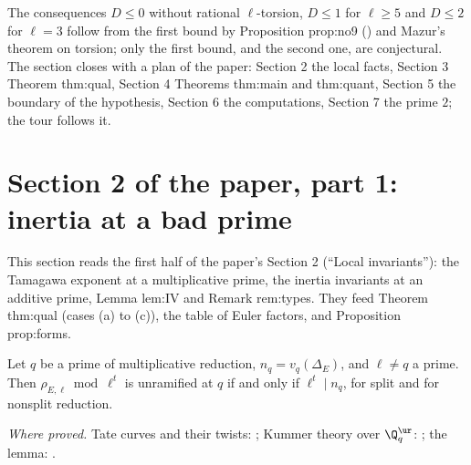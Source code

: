 \begin{sloppypar}
\noindent The consequences $D\le0$ without rational $\ell$-torsion, $D\le1$ for $\ell\ge5$ and $D\le2$ for $\ell=3$ follow from the first bound by Proposition prop:no9
() and Mazur's theorem on torsion; only the first bound, and the second one, are conjectural. The section closes with a plan of the paper:
Section 2 the local facts, Section 3 Theorem thm:qual, Section 4 Theorems thm:main and thm:quant, Section 5 the boundary of the hypothesis, Section 6 the
computations, Section 7 the prime $2$; the tour follows it.

\section[Paper 2: inertia]{Section 2 of the paper, part 1: inertia at a bad prime}\label{sec:paper:inertia}

This section reads the first half of the paper's Section 2 (``Local invariants''): the Tamagawa exponent at a multiplicative prime, the inertia
invariants at an additive prime, Lemma lem:IV and Remark rem:types. They feed Theorem thm:qual (cases (a) to (c)), the table of Euler factors, and
Proposition prop:forms.

\begin{lemma}\label{lem:paper:tamagawa-exp}
Let $q$ be a prime of multiplicative reduction, $n_q=v_q(\Delta_E)$, and $\ell\ne q$ a prime. Then $\rho_{E,\ell}\bmod\ell^t$ is unramified at $q$ if and only if $\ell^t\mid n_q$, for
split and for nonsplit reduction.
\end{lemma}

\noindent\emph{Where proved.} Tate curves and their twists: ; Kummer theory over $\Q_q^{\ur}$: ; the lemma: .


\end{sloppypar}

